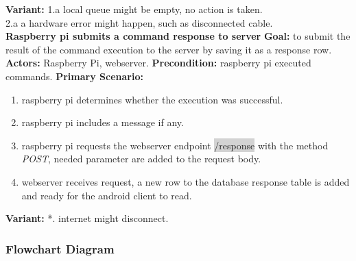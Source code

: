 \documentclass[12pt, oneside, a4paper]{book}
\newcommand{\code}[1]{{\color{red}\colorbox{lightgray}{#1}}}
\newcommand\boldcolor[1]{\textcolor{bold}{\textbf{#1}}}
\begin{document}
				\textbf{Variant:}\newline	
				\hspace*{5mm}1.a local queue might be empty, no action is taken. \\
				\hspace*{5mm}2.a a hardware error might happen, such as disconnected cable. \\
				\newline\boldcolor{Raspberry pi submits a command response to server}
				\newline\textbf{Goal:} to submit the result of the command execution to the server by saving it as a response row.
				\newline\textbf{Actors:} Raspberry Pi, webserver.
				\newline\textbf{Precondition:} raspberry pi executed commands.
				\newline\textbf{Primary Scenario:}	
				\begin{enumerate}[label*=\arabic*.]
					\item raspberry pi determines whether the execution was successful. 
					\item raspberry pi includes a message if any.
					\item  raspberry pi requests the webserver endpoint \code{/response} with the method \textit{POST}, needed parameter are added to the request body.
					\item webserver receives request, a new row to the database response table is added and ready for the android client to read. 
				 
				\end{enumerate}
				\textbf{Variant:}\newline	
				\hspace*{5mm}*. internet might disconnect.
					
						
				
				\newpage\subsubsection{Flowchart Diagram}
\end{document}
